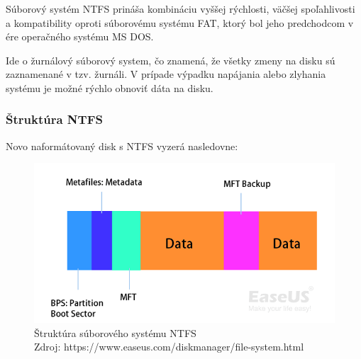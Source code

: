 \documentclass[12pt,oneside,slovak,a4paper]{article}
\begin{document}
Súborový systém NTFS prináša kombináciu vyššej rýchlosti, väčšej spoľahlivosti a kompatibility oproti súborovému systému FAT, ktorý bol jeho predchodcom v ére operačného systému MS DOS.

Ide o žurnálový súborový system, čo znamená, že všetky zmeny na disku sú zaznamenané v tzv. žurnáli. V prípade výpadku napájania alebo zlyhania systému je možné rýchlo obnoviť dáta na disku.

\subsubsection{Štruktúra NTFS}
Novo naformátovaný disk s NTFS vyzerá nasledovne:

\begin{figure}[H]
	\centering
	\captionsetup{justification=centering,margin=2cm}
	\includegraphics[width=\linewidth]{./images/ntfs-file-system-structure.png}
	\centering
	\caption{Štruktúra súborového systému NTFS \\ Zdroj: https://www.easeus.com/diskmanager/file-system.html}
\end{figure}
\end{document}
